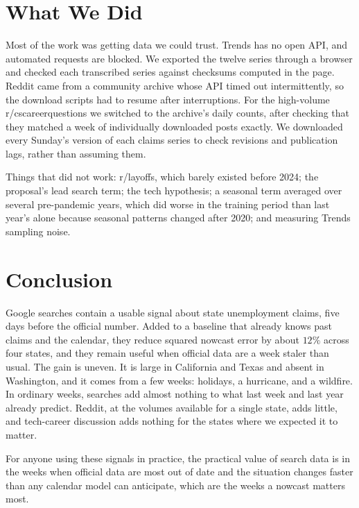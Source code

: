 \documentclass[sigconf,nonacm]{acmart}
\begin{document}
\section{What We Did}

Most of the work was getting data we could trust. Trends has no open API, and automated
requests are blocked. We exported the twelve series through a browser and checked each
transcribed series against checksums computed in the page. Reddit came from a community
archive whose API timed out intermittently, so the download scripts had to resume after
interruptions. For the high-volume r/cscareerquestions we switched to the archive's daily
counts, after checking that they matched a week of individually downloaded posts exactly.
We downloaded every Sunday's version of each claims series to check revisions and
publication lags, rather than assuming them.

Things that did not work: r/layoffs, which barely existed before 2024; the proposal's lead
search term; the tech hypothesis; a seasonal term averaged over several pre-pandemic years,
which did worse in the training period than last year's alone because seasonal patterns
changed after 2020; and measuring Trends sampling noise.

\section{Conclusion}

Google searches contain a usable signal about state unemployment claims, five days before
the official number. Added to a baseline that already knows past claims and the calendar,
they reduce squared nowcast error by about $12\%$ across four states, and they remain
useful when official data are a week staler than usual. The gain is uneven. It is large in
California and Texas and absent in Washington, and it comes from a few weeks: holidays, a
hurricane, and a wildfire. In ordinary weeks, searches add almost nothing to what last week
and last year already predict. Reddit, at the volumes available for a single state, adds
little, and tech-career discussion adds nothing for the states where we expected it to
matter.

For anyone using these signals in practice, the practical value of search data is in the
weeks when official data are most out of date and the situation changes faster than any
calendar model can anticipate, which are the weeks a nowcast matters most.



\end{document}
